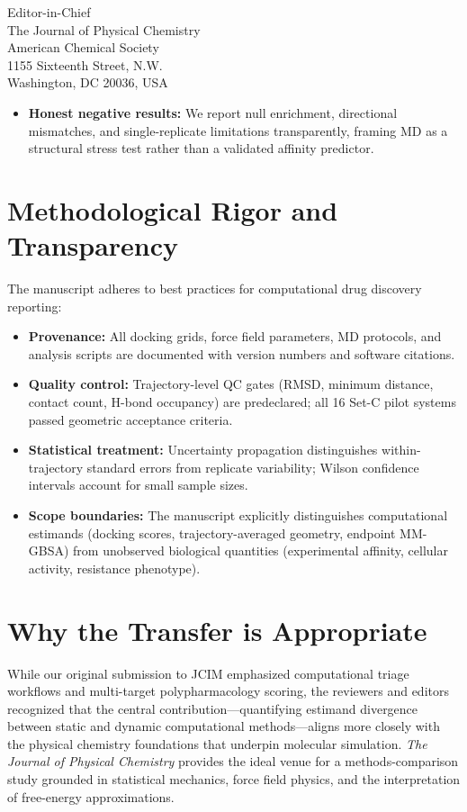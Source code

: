 \documentclass[11pt]{letter}
\begin{document}
\begin{letter}{%
    Editor-in-Chief \\
    The Journal of Physical Chemistry \\
    American Chemical Society \\
    1155 Sixteenth Street, N.W. \\
    Washington, DC 20036, USA
}
\begin{itemize}
    \item \textbf{Honest negative results:} We report null enrichment, directional mismatches, and single-replicate limitations transparently, framing MD as a structural stress test rather than a validated affinity predictor.
\end{itemize}

\section*{Methodological Rigor and Transparency}

The manuscript adheres to best practices for computational drug discovery reporting:

\begin{itemize}
    \item \textbf{Provenance:} All docking grids, force field parameters, MD protocols, and analysis scripts are documented with version numbers and software citations.
    
    \item \textbf{Quality control:} Trajectory-level QC gates (RMSD, minimum distance, contact count, H-bond occupancy) are predeclared; all 16 Set-C pilot systems passed geometric acceptance criteria.
    
    \item \textbf{Statistical treatment:} Uncertainty propagation distinguishes within-trajectory standard errors from replicate variability; Wilson confidence intervals account for small sample sizes.
    
    \item \textbf{Scope boundaries:} The manuscript explicitly distinguishes computational estimands (docking scores, trajectory-averaged geometry, endpoint MM-GBSA) from unobserved biological quantities (experimental affinity, cellular activity, resistance phenotype).
\end{itemize}

\section*{Why the Transfer is Appropriate}

While our original submission to JCIM emphasized computational triage workflows and multi-target polypharmacology scoring, the reviewers and editors recognized that the central contribution---quantifying estimand divergence between static and dynamic computational methods---aligns more closely with the physical chemistry foundations that underpin molecular simulation. \textit{The Journal of Physical Chemistry} provides the ideal venue for a methods-comparison study grounded in statistical mechanics, force field physics, and the interpretation of free-energy approximations.


\end{letter}
\end{document}
